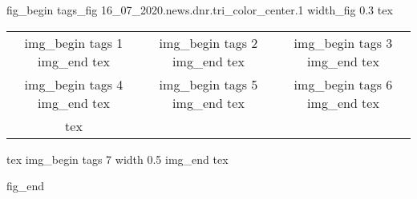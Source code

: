  
 
 
\ifcmt
fig_begin
	tags_fig 16_07_2020.news.dnr.tri_color_center.1
	width_fig 0.3
	tex \begin{tabular}{ccc}
	img_begin 
		tags 1
	img_end
	tex &
	img_begin 
		tags 2
	img_end
	tex &
	img_begin 
		tags 3
	img_end
	tex \\
	img_begin 
		tags 4
	img_end
	tex &
	img_begin 
		tags 5
	img_end
	tex &
	img_begin 
		tags 6
	img_end
	tex \\
	tex \end{tabular}
	tex \centering
	img_begin 
		tags 7
		width 0.5
	img_end
	tex \caption{\sectitle}
fig_end
\fi

